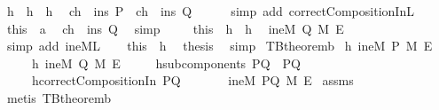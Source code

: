 \begin{isabellebody}
\ h{}\ \ h{}\ \ h{}\ \isamarkupfalse%
\ {\isachardoublequoteopen}{\isacharparenleft}ch\ {\isasymin}\ ins\ P{\isacharparenright}\ {\isasymor}\ {\isacharparenleft}ch\ {\isasymin}\ ins\ Q{\isacharparenright}{\isachardoublequoteclose}\isanewline
\ \ \ \ \isamarkupfalse%
\ {\isacharparenleft}simp\ add{\isacharcolon}\ correctCompositionIn{\isacharunderscore}L{}{\isacharparenright}\isanewline
\ \ \isamarkupfalse%
\ this\ \ a{}\ \isamarkupfalse%
\ {\isachardoublequoteopen}ch\ {\isasymin}\ ins\ Q{\isachardoublequoteclose}\ \isamarkupfalse%
\ simp\ \isanewline
\ \ \isamarkupfalse%
\ this\ \ h{}\ \ h{}\ \isamarkupfalse%
\ {\isachardoublequoteopen}ineM\ Q\ M\ E{\isachardoublequoteclose}\ \isamarkupfalse%
\ {\isacharparenleft}simp\ add{\isacharcolon}\ ineM{\isacharunderscore}L{}{\isacharparenright}\isanewline
\ \ \isamarkupfalse%
\ this\ \ h{}\ \isamarkupfalse%
\ {\isacharquery}thesis\ \isamarkupfalse%
\ simp\isanewline
{}\isamarkupfalse%
%
\endisatagproof
{\isafoldproof}%
%
\isadelimproof
\isanewline
%
\endisadelimproof
\isanewline
{}\isamarkupfalse%
\ TBtheorem{}b{\isacharcolon}\isanewline
{}\ h{}{\isacharcolon}{\isachardoublequoteopen}{\isasymnot}\ {\isacharparenleft}ineM\ P\ M\ E{\isacharparenright}{\isachardoublequoteclose}\isanewline
\ \ \ \ \ h{}{\isacharcolon}{\isachardoublequoteopen}{\isasymnot}\ {\isacharparenleft}ineM\ Q\ M\ E{\isacharparenright}{\isachardoublequoteclose}\isanewline
\ \ \ \ \ h{}{\isacharcolon}{\isachardoublequoteopen}subcomponents\ PQ\ {\isacharequal}\ {\isacharbraceleft}P{\isacharcomma}Q{\isacharbraceright}{\isachardoublequoteclose}\isanewline
\ \ \ \ \ h{}{\isacharcolon}{\isachardoublequoteopen}correctCompositionIn\ PQ{\isachardoublequoteclose}\isanewline
\ \ \ \ \ \ {\isachardoublequoteopen}{\isasymnot}\ {\isacharparenleft}ineM\ PQ\ M\ E{\isacharparenright}{\isachardoublequoteclose}\isanewline
%
\isadelimproof
%
\endisadelimproof
%
\isatagproof
{}\isamarkupfalse%
\ assms\ \isamarkupfalse%
\ {\isacharparenleft}metis\ TBtheorem{}b{\isacharparenright}%

\end{isabellebody}
